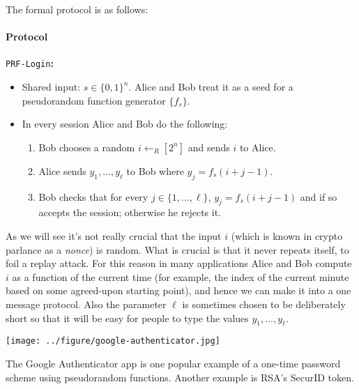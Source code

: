 The formal protocol is as follows:

\paragraph{Protocol} \texttt{PRF-Login}\textbf{:}

\begin{itemize}
\tightlist
\item
  Shared input: \(s\in\{0,1\}^n\). Alice and Bob treat it as a seed for
  a pseudorandom function generator \(\{ f_s \}\).
\item
  In every session Alice and Bob do the following:

  \begin{enumerate}
  \def\labelenumi{\arabic{enumi}.}
  \tightlist
  \item
    Bob chooses a random \(i\leftarrow_R[2^n]\) and sends \(i\) to
    Alice.
  \item
    Alice sends \(y_1,\ldots,y_\ell\) to Bob where \(y_j = f_s(i+j-1)\).
  \item
    Bob checks that for every \(j\in\{1,\ldots,\ell\}\),
    \(y_j = f_s(i+j-1)\) and if so accepts the session; otherwise he
    rejects it.
  \end{enumerate}
\end{itemize}

As we will see it's not really crucial that the input \(i\) (which is
known in crypto parlance as a \emph{nonce}) is random. What is crucial
is that it never repeats itself, to foil a replay attack. For this
reason in many applications Alice and Bob compute \(i\) as a function of
the current time (for example, the index of the current minute based on
some agreed-upon starting point), and hence we can make it into a one
message protocol. Also the parameter \(\ell\) is sometimes chosen to be
deliberately short so that it will be easy for people to type the values
\(y_1,\ldots,y_\ell\).


\begin{marginfigure}
\centering
\texttt{[image: ../figure/google-authenticator.jpg]}
\caption{The Google Authenticator app is one popular example of a
one-time password scheme using pseudorandom functions. Another example
is RSA's SecurID token.}
\label{tmplabelfig}
\end{marginfigure}

